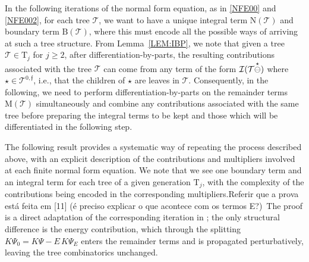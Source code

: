 \documentclass[a4paper,
11pt,  reqno]{amsart}
\makeatletter
\newcommand{\blue}{\color{blue}}
\newcommand{\orange}{\color{orange}}
\newcommand{\5}{\textup{V}}
\theoremstyle{remark}
\newcommand{\TT}{\mathcal{T}}
\newcommand{\Tr}{\mathrm{T}}
\newcommand{\ff}{\mathfrak{f}}
\def\<#1>{\csname MH@symb@#1\endcsname}
\newcommand{\Ical}{\mathcal{I}}
\numberwithin{equation}{section}
\numberwithin{theorem}{section}
\newcommand{\MM}{\mathrm{M}}
\newcommand{\NN}{\mathrm{N}}
\newcommand{\BB}{\mathrm{B}}
\makeatother
\begin{document}
In the following iterations of the normal form equation, as in \eqref{NFE00} and \eqref{NFE002}, for each tree $\TT$, we want to have a unique integral term $\NN(\TT)$ and boundary term $\BB(\TT)$, 
where this must encode all the possible ways of arriving at such a tree structure. 
From Lemma~\ref{LEM:IBP}, we note that given a tree $\TT \in \Tr_j$ for $j\ge2$, after differentiation-by-parts, the resulting contributions associated with the tree $\TT$ can come from any term of the form $\Ical(\TT \overset{\star}{\ominus} \<1>)$ where $\star \in \TT^{0, \ff}$, i.e., that the children of $\star$ are leaves in $\TT$. Consequently, in the following, we need to perform differentiation-by-parts on the remainder terms $\MM(\TT)$ simultaneously and combine any contributions associated with the same tree before preparing the integral terms to be kept and those which will be differentiated in the following step. 

The following result provides a systematic way of repeating the process described above, with an explicit description of the contributions and multipliers involved at each finite normal form equation. 
We note that we see one boundary term and an integral term for each tree of a given generation $\Tr_j$, with the complexity of the contributions being encoded in the corresponding multipliers.{\blue Referir que a prova está feita em [11] (é preciso explicar o que acontece com os termos E?)}{\orange\ The proof is a direct adaptation of the corresponding iteration in \cite{bit,chcora}; the only structural difference is the energy contribution, which through the splitting $K\Psi_0=K\Psi-E\,K\Psi_E$ enters the remainder terms and is propagated perturbatively, leaving the tree combinatorics unchanged.}
\end{document}

